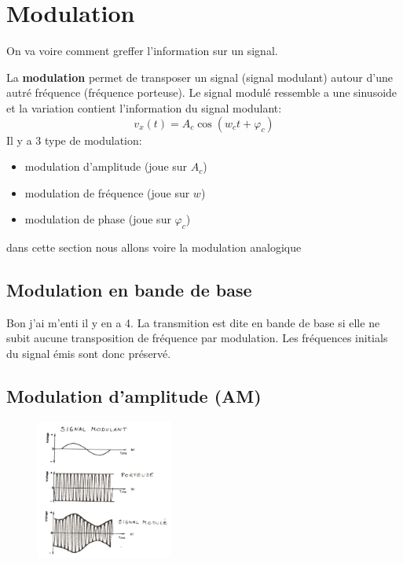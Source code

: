 \section{Modulation}
	On va voire comment greffer l'information sur un signal.
	
	La \textbf{modulation} permet de transposer un signal (signal modulant) autour d'une autré fréquence (fréquence porteuse). Le signal modulé ressemble a une sinusoide et la variation contient l'information du signal modulant:
	\begin{equation}
		v_x(t) = A_c \cos(w_ct + \varphi_c)
	\end{equation}
	Il y a 3 type de modulation:
	\begin{itemize}
		\item modulation d'amplitude (joue sur $A_c$)
		\item modulation de fréquence (joue sur $w$)
		\item modulation de phase (joue sur $\varphi_c$)
	\end{itemize}
	
	dans cette section nous allons voire la modulation analogique
	
	\subsection{Modulation en bande de base}
		Bon j'ai m'enti il y en a 4.
		La transmition est dite en bande de base si elle ne subit aucune transposition de fréquence par modulation. Les fréquences initials du signal émis sont donc préservé.
	\subsection{Modulation d'amplitude (AM)}
		
		\begin{figure}[htp]
			\centering
			\includegraphics[width=0.4\textwidth]{img/modulationAM.png}
		\end{figure}
		
